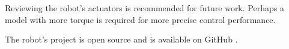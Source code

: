 \documentclass[conference]{IEEEtran}
\begin{document}
Reviewing the robot's actuators is recommended for future work. Perhaps a model with more torque is required for more precise control performance.

The robot's project is open source and is available on GitHub \cite{CaramelRepo}.







\end{document}
